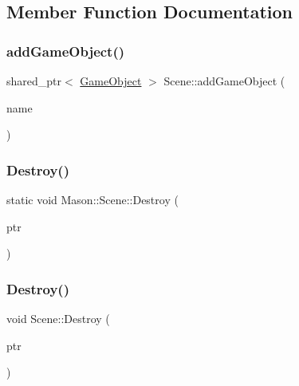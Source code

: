 \subsection{Member Function Documentation}
\hypertarget{class_mason_1_1_scene_afe8ac9cb371c04a0587faf06bf828ac9}{}\label{class_mason_1_1_scene_afe8ac9cb371c04a0587faf06bf828ac9} 
\subsubsection{\texorpdfstring{add\+Game\+Object()}{addGameObject()}}
{\footnotesize\ttfamily shared\+\_\+ptr$<$ \hyperlink{class_mason_1_1_game_object}{Game\+Object} $>$ Scene\+::add\+Game\+Object (\begin{DoxyParamCaption}\item[{std\+::string}]{name }\end{DoxyParamCaption})}

\hypertarget{class_mason_1_1_scene_a4721fcf8438883759478aee25bf247c2}{}\label{class_mason_1_1_scene_a4721fcf8438883759478aee25bf247c2} 
\subsubsection{\texorpdfstring{Destroy()}{Destroy()}\hspace{0.1cm}{\footnotesize\ttfamily [1/2]}}
{\footnotesize\ttfamily static void Mason\+::\+Scene\+::\+Destroy (\begin{DoxyParamCaption}\item[{std\+::shared\+\_\+ptr$<$ \hyperlink{class_mason_1_1_game_object}{Game\+Object} $>$}]{ptr }\end{DoxyParamCaption})\hspace{0.3cm}{\ttfamily [static]}}

\hypertarget{class_mason_1_1_scene_a8f395f22c024c0d5161cfa8e024f177d}{}\label{class_mason_1_1_scene_a8f395f22c024c0d5161cfa8e024f177d} 
\subsubsection{\texorpdfstring{Destroy()}{Destroy()}\hspace{0.1cm}{\footnotesize\ttfamily [2/2]}}
{\footnotesize\ttfamily void Scene\+::\+Destroy (\begin{DoxyParamCaption}\item[{\hyperlink{class_mason_1_1_game_object}{Game\+Object} $\ast$}]{ptr }\end{DoxyParamCaption})\hspace{0.3cm}{\ttfamily [static]}}

